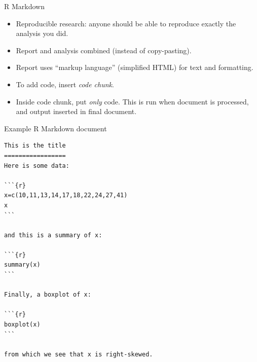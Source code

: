 \begin{frame}[fragile]{R Markdown}
  
  \begin{itemize}
  \item Reproducible research: anyone should be able to reproduce
    exactly the analysis you did.
  \item Report and analysis combined (instead of copy-pasting).
  \item Report uses ``markup language'' (simplified HTML) for text
    and formatting.
  \item To add code, insert \emph{code chunk}.
  \item Inside code chunk, put \emph{only} code. This is run when
    document is processed, and output inserted in final document.
  \end{itemize}
  
\end{frame}

\begin{frame}[fragile]{Example R Markdown document}

{\scriptsize  
\begin{verbatim}
This is the title
=================
Here is some data:

```{r}
x=c(10,11,13,14,17,18,22,24,27,41)
x
```

and this is a summary of x:

```{r}
summary(x)
```

Finally, a boxplot of x:

```{r}
boxplot(x)
```

from which we see that x is right-skewed.
\end{verbatim}
  }
  
\end{frame}


